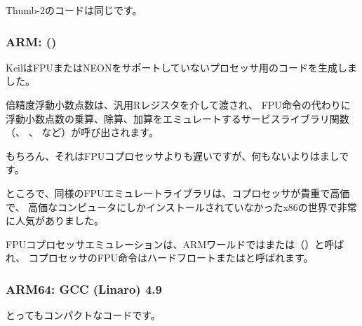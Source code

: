 Thumb-2のコードは同じです。

\subsubsection{ARM: \OptimizingKeilVI (\ThumbMode)}



KeilはFPUまたはNEONをサポートしていないプロセッサ用のコードを生成しました。

倍精度浮動小数点数は、汎用Rレジスタを介して渡され、
FPU命令の代わりに浮動小数点数の乗算、除算、加算をエミュレートするサービスライブラリ関数
（、 、 など）が呼び出されます。

もちろん、それはFPUコプロセッサよりも遅いですが、何もないよりはましです。

ところで、同様のFPUエミュレートライブラリは、コプロセッサが貴重で高価で、
高価なコンピュータにしかインストールされていなかったx86の世界で非常に人気がありました。


FPUコプロセッサエミュレーションは、ARMワールドではまたは（）と呼ばれ、
コプロセッサのFPU命令はハードフロートまたはと呼ばれます。

\iffalse
\myindex{Raspberry Pi}

For example, the Linux kernel for Raspberry Pi is compiled in two variants.

In the \IT{soft float} case, arguments are passed via R-registers, and in the \IT{hard float} case---via D-registers.

And that is what stops you from using armhf-libraries from armel-code or vice versa,
and that is why all the code in Linux distributions must be compiled according to a single convention.
\fi

\subsubsection{ARM64: \Optimizing GCC (Linaro) 4.9}

とってもコンパクトなコードです。



